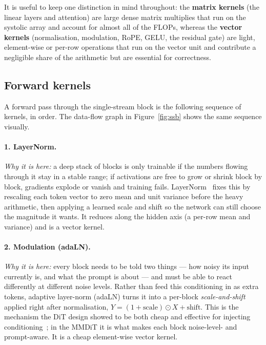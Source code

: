 \documentclass[11pt]{report}
\begin{document}
It is useful to keep one distinction in mind throughout: the
\textbf{matrix kernels} (the linear layers and attention) are large dense
matrix multiplies that run on the systolic array and account for almost
all of the FLOPs, whereas the \textbf{vector kernels} (normalisation,
modulation, RoPE, GELU, the residual gate) are light, element-wise or
per-row operations that run on the vector unit and contribute a negligible
share of the arithmetic but are essential for correctness.

\subsection{Forward kernels}
\label{sec:fwd-kernels}

A forward pass through the single-stream block is the following sequence
of kernels, in order. The data-flow graph in Figure~\ref{fig:ssb} shows
the same sequence visually.

\paragraph{1. LayerNorm.} \emph{Why it is here:} a deep stack of blocks is
only trainable if the numbers flowing through it stay in a stable range; if
activations are free to grow or shrink block by block, gradients explode or
vanish and training fails. LayerNorm~\cite{ba2016layernorm} fixes this by
rescaling each token vector to zero mean and unit variance before the heavy
arithmetic, then applying a learned scale and shift so the network can still
choose the magnitude it wants. It reduces along the hidden axis (a per-row
mean and variance) and is a vector kernel.

\begin{algorithm}[H]
\DontPrintSemicolon
{}
\caption{LayerNorm (vector; ${\sim}S\!\cdot\!\mathrm{HD}$ elements)}
\end{algorithm}

\paragraph{2. Modulation (adaLN).} \emph{Why it is here:} every block needs
to be told two things --- how noisy its input currently is, and what the
prompt is about --- and must be able to react differently at different
noise levels. Rather than feed this conditioning in as extra tokens,
adaptive layer-norm (adaLN) turns it into a per-block
\emph{scale-and-shift} applied right after normalisation,
$Y = (1+\text{scale})\odot X + \text{shift}$. This is the mechanism the DiT
design showed to be both cheap and effective for injecting
conditioning~\cite{peebles2023dit}; in the MMDiT it is what makes each
block noise-level- and prompt-aware. It is a cheap element-wise vector
kernel.
\end{document}
